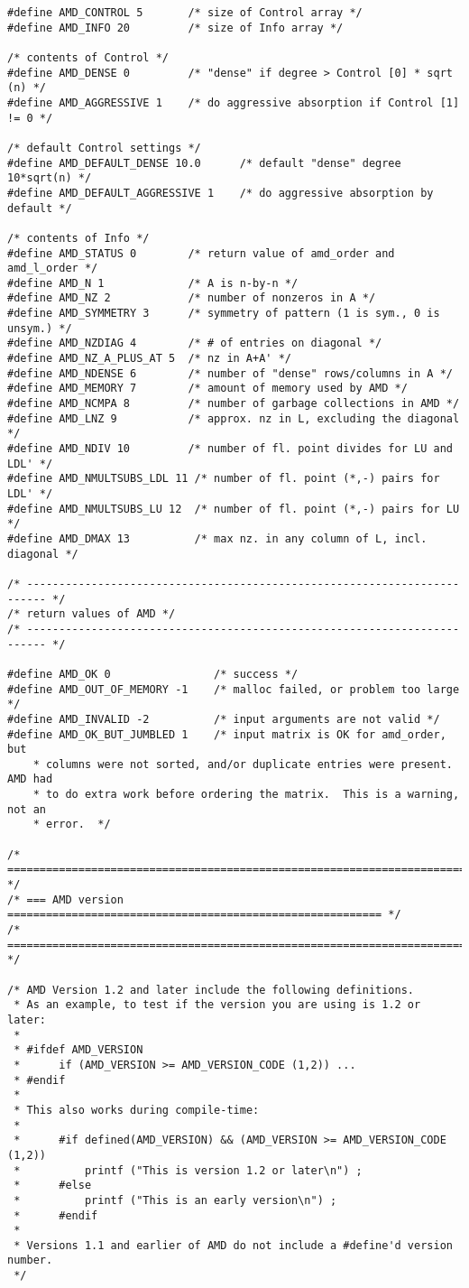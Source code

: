 \documentclass[11pt]{article}
\begin{document}
{\begin{verbatim}
#define AMD_CONTROL 5       /* size of Control array */
#define AMD_INFO 20         /* size of Info array */

/* contents of Control */
#define AMD_DENSE 0         /* "dense" if degree > Control [0] * sqrt (n) */
#define AMD_AGGRESSIVE 1    /* do aggressive absorption if Control [1] != 0 */

/* default Control settings */
#define AMD_DEFAULT_DENSE 10.0      /* default "dense" degree 10*sqrt(n) */
#define AMD_DEFAULT_AGGRESSIVE 1    /* do aggressive absorption by default */

/* contents of Info */
#define AMD_STATUS 0        /* return value of amd_order and amd_l_order */
#define AMD_N 1             /* A is n-by-n */
#define AMD_NZ 2            /* number of nonzeros in A */ 
#define AMD_SYMMETRY 3      /* symmetry of pattern (1 is sym., 0 is unsym.) */
#define AMD_NZDIAG 4        /* # of entries on diagonal */
#define AMD_NZ_A_PLUS_AT 5  /* nz in A+A' */
#define AMD_NDENSE 6        /* number of "dense" rows/columns in A */
#define AMD_MEMORY 7        /* amount of memory used by AMD */
#define AMD_NCMPA 8         /* number of garbage collections in AMD */
#define AMD_LNZ 9           /* approx. nz in L, excluding the diagonal */
#define AMD_NDIV 10         /* number of fl. point divides for LU and LDL' */
#define AMD_NMULTSUBS_LDL 11 /* number of fl. point (*,-) pairs for LDL' */
#define AMD_NMULTSUBS_LU 12  /* number of fl. point (*,-) pairs for LU */
#define AMD_DMAX 13          /* max nz. in any column of L, incl. diagonal */

/* ------------------------------------------------------------------------- */
/* return values of AMD */
/* ------------------------------------------------------------------------- */

#define AMD_OK 0                /* success */
#define AMD_OUT_OF_MEMORY -1    /* malloc failed, or problem too large */
#define AMD_INVALID -2          /* input arguments are not valid */
#define AMD_OK_BUT_JUMBLED 1    /* input matrix is OK for amd_order, but
    * columns were not sorted, and/or duplicate entries were present.  AMD had
    * to do extra work before ordering the matrix.  This is a warning, not an
    * error.  */

/* ========================================================================== */
/* === AMD version ========================================================== */
/* ========================================================================== */

/* AMD Version 1.2 and later include the following definitions.
 * As an example, to test if the version you are using is 1.2 or later:
 *
 * #ifdef AMD_VERSION
 *      if (AMD_VERSION >= AMD_VERSION_CODE (1,2)) ...
 * #endif
 *
 * This also works during compile-time:
 *
 *      #if defined(AMD_VERSION) && (AMD_VERSION >= AMD_VERSION_CODE (1,2))
 *          printf ("This is version 1.2 or later\n") ;
 *      #else
 *          printf ("This is an early version\n") ;
 *      #endif
 *
 * Versions 1.1 and earlier of AMD do not include a #define'd version number.
 */


\end{verbatim}}
\end{document}
